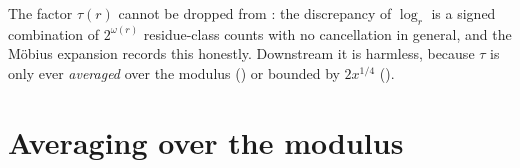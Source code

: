 
\begin{remark}
The factor $\tau(r)$ cannot be dropped from : the discrepancy of $\log_r$ is
a signed combination of $2^{\omega(r)}$ residue-class counts with no cancellation in general, and the
Möbius expansion records this honestly. Downstream it is harmless, because $\tau$ is only ever
\emph{averaged} over the modulus () or bounded by $2x^{1/4}$
().
\end{remark}

\section{Averaging over the modulus}



